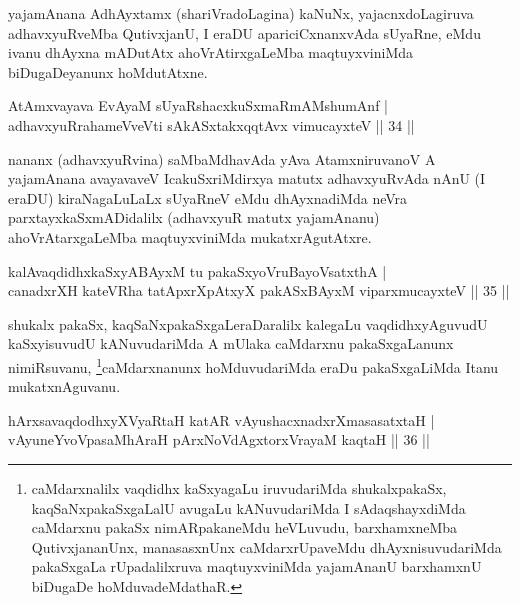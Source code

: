 \begin{artha}
yajamAnana AdhAyxtamx (shariVradoLagina) kaNuNx, yajacnxdoLagiruva adhavxyuRveMba QutivxjanU, I eraDU apariciCxnanxvAda sUyaRne, eMdu ivanu dhAyxna mADutAtx ahoVrAtirxgaLeMba maqtuyxviniMda biDugaDeyanunx hoMdutAtxne.
\end{artha}


\begin{shl}
AtAmxvayava EvAyaM sUyaRshacxkuSxmaRmAMshumAnf |\\
adhavxyuRrahameVveVti sAkASxtakxqqtAvx vimucayxteV \hfill || 34 ||
\end{shl}

\begin{artha}
nananx (adhavxyuRvina) saMbaMdhavAda yAva AtamxniruvanoV A yajamAnana avayavaveV IcakuSxriMdirxya matutx adhavxyuRvAda nAnU (I eraDU) kiraNagaLuLaLx sUyaRneV eMdu dhAyxnadiMda neVra parxtayxkaSxmADidalilx (adhavxyuR matutx yajamAnanu) ahoVrAtarxgaLeMba maqtuyxviniMda mukatxrAgutAtxre.
\end{artha}


\begin{shl}
kalAvaqdidhxkaSxyABAyxM tu pakaSxyoVruBayoVsatxthA |\\
canadxrXH kateVRha tatApxrXpAtxyX pakASxBAyxM viparxmucayxteV \hfill || 35 ||
\end{shl}

\begin{artha}
shukalx pakaSx, kaqSaNxpakaSxgaLeraDaralilx kalegaLu vaqdidhxyAguvudU kaSxyisuvudU kANuvudariMda A mUlaka caMdarxnu pakaSxgaLanunx nimiRsuvanu, \footnote[1]{caMdarxnalilx vaqdidhx kaSxyagaLu iruvudariMda shukalxpakaSx, kaqSaNxpakaSxgaLalU avugaLu kANuvudariMda I sAdaqshayxdiMda caMdarxnu pakaSx nimARpakaneMdu heVLuvudu, barxhamxneMba QutivxjananUnx, manasasxnUnx caMdarxrUpaveMdu dhAyxnisuvudariMda pakaSxgaLa rUpadalilxruva maqtuyxviniMda yajamAnanU barxhamxnU biDugaDe hoMduvadeMdathaR.}caMdarxnanunx hoMduvudariMda eraDu pakaSxgaLiMda Itanu mukatxnAguvanu.
\end{artha}


\begin{shl}
hArxsavaqdodhxyXVyaRtaH katAR vAyushacxnadxrXmasasatxtaH |\\
vAyuneYvoVpasaMhAraH pArxNoVdAgxtorxVrayaM kaqtaH \hfill || 36 ||
\end{shl}

